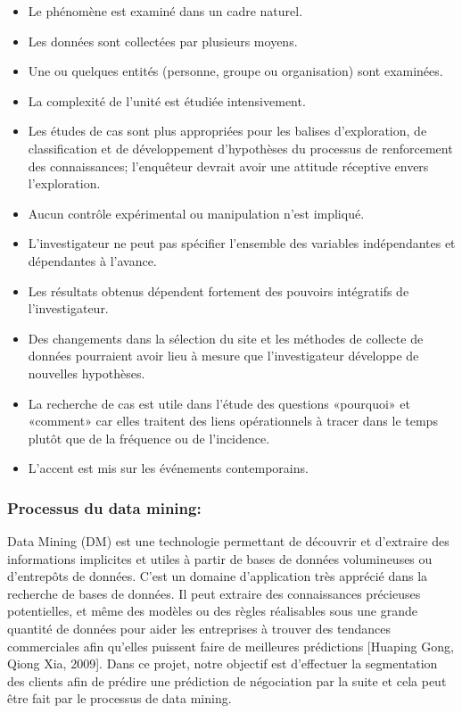 \documentclass[12pt]{article}
\begin{document}
{\begin{itemize}
\item Le phénomène est examiné dans un cadre naturel.
\item Les données sont collectées par plusieurs moyens.
\item Une ou quelques entités (personne, groupe ou organisation) sont examinées.
\item La complexité de l'unité est étudiée intensivement.
\item Les études de cas sont plus appropriées pour les balises d'exploration, de classification et de développement d'hypothèses du processus de renforcement des connaissances; l'enquêteur devrait avoir une attitude réceptive envers l'exploration.
\item Aucun contrôle expérimental ou manipulation n'est impliqué.
\item L'investigateur ne peut pas spécifier l'ensemble des variables indépendantes et dépendantes à l'avance.
\item  Les résultats obtenus dépendent fortement des pouvoirs intégratifs de l'investigateur.
\item Des changements dans la sélection du site et les méthodes de collecte de données pourraient avoir lieu à mesure que l'investigateur développe de nouvelles hypothèses.
\item La recherche de cas est utile dans l'étude des questions «pourquoi» et «comment» car elles traitent des liens opérationnels à tracer dans le temps plutôt que de la fréquence ou de l'incidence.
\item L'accent est mis sur les événements contemporains.
\end{itemize}

\subsubsection{Processus du data mining:}
Data Mining (DM) est une technologie permettant de découvrir et d'extraire des informations implicites et utiles à partir de bases de données volumineuses ou d'entrepôts de données. C'est un domaine d'application très apprécié dans la recherche de bases de données. Il peut extraire des connaissances précieuses potentielles, et même des modèles ou des règles réalisables sous une grande quantité de données pour aider les entreprises à trouver des tendances commerciales afin qu'elles puissent faire de meilleures prédictions {\color{red}[Huaping Gong, Qiong Xia, 2009]}. Dans ce projet, notre objectif est d'effectuer la segmentation des clients  afin de prédire une prédiction de négociation par la suite et cela peut être fait par le processus de data mining.

}
\end{document}
